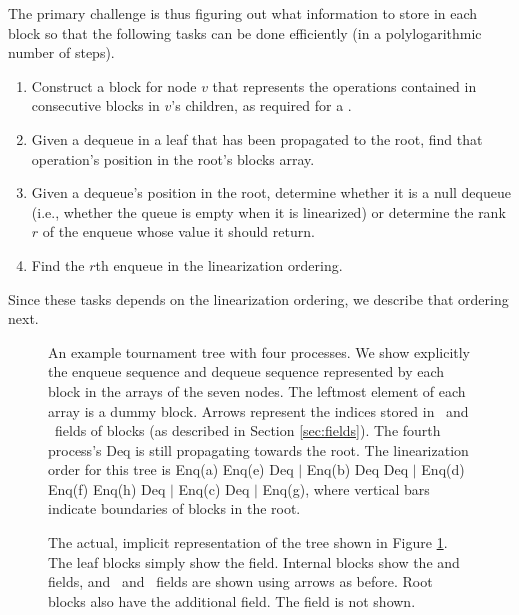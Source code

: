 The primary challenge is thus figuring out what information to store in each block so that 
the following tasks can be done efficiently (in a polylogarithmic number of steps).
\begin{enumerate}[label={(T\arabic*)}]
\item
\label{construct}
Construct a block for node $v$ that represents the operations contained in consecutive blocks in $v$'s children, as required for a .
\item
\label{findinroot}
Given a dequeue in a leaf that has been propagated to the root, find that operation's position in the root's blocks array.
\item
\label{findrank}
Given a dequeue's position in the root, determine whether it is a null dequeue (i.e., whether the queue is empty when it is linearized)
or determine the rank $r$ of the enqueue whose value it should return.
\item
\label{findenqueue}
Find the $r$th enqueue in the linearization ordering.
\end{enumerate}
Since these tasks depends on the linearization ordering, we describe that ordering next.

\begin{figure}[tb]

\caption{An example tournament tree with four processes. 
We show explicitly the enqueue sequence and dequeue sequence represented by each block in the  arrays of the seven nodes.  The leftmost element of each  array is a dummy block.
Arrows represent the indices stored in \eleft\ and \eright\ fields of blocks (as described in Section \ref{sec:fields}).
The fourth process's Deq is still propagating towards the root.
The linearization order for this tree is
Enq(a) Enq(e) Deq $\mid$ Enq(b) Deq Deq $\mid$ Enq(d) Enq(f) Enq(h) Deq $\mid$ Enq(c) Deq $\mid$ Enq(g), where vertical bars indicate boundaries of blocks in the root.\label{tournament}}
\end{figure}

\begin{figure}

\caption{\label{implicit}The actual, implicit representation of the tree shown in Figure \ref{tournament}.
The leaf blocks simply show the  field.
Internal blocks show the  and  fields,
and \eleft\ and \eright\ fields are shown using arrows as before.
Root blocks also have the additional  field.
The  field is not shown.}
\end{figure}

